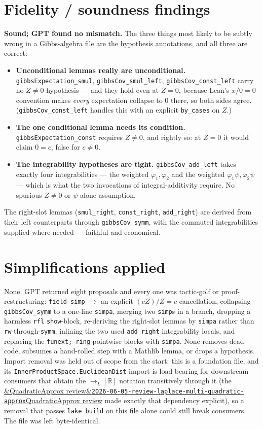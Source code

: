 \documentclass[11pt]{article}
\newcommand{\reviewref}[2][]{\href{https://therisensea.org/reviews/#2/}{\ifx&#1&\texttt{#2}\else#1\fi}}
\begin{document}
\section{Fidelity / soundness findings}
\textbf{Sound; GPT found no mismatch.} The three things most likely to be subtly wrong in a Gibbs-algebra file
are the hypothesis annotations, and all three are correct:
\begin{itemize}[noitemsep]
  \item \textbf{Unconditional lemmas really are unconditional.} \texttt{gibbsExpectation\_smul},
    \texttt{gibbsCov\_smul\_left}, \texttt{gibbsCov\_const\_left} carry no $Z\ne0$ hypothesis --- and they hold
    even at $Z=0$, because Lean's $x/0=0$ convention makes \emph{every} expectation collapse to $0$ there, so
    both sides agree. (\texttt{gibbsCov\_const\_left} handles this with an explicit \texttt{by\_cases} on $Z$.)
  \item \textbf{The one conditional lemma needs its condition.} \texttt{gibbsExpectation\_const} requires
    $Z\ne0$, and rightly so: at $Z=0$ it would claim $0=c$, false for $c\ne0$.
  \item \textbf{The integrability hypotheses are tight.} \texttt{gibbsCov\_add\_left} takes exactly four
    integrabilities --- the weighted $\varphi_1,\varphi_2$ and the weighted $\varphi_1\psi,\varphi_2\psi$ ---
    which is what the two invocations of integral-additivity require. No spurious $Z\ne0$ or $\psi$-alone
    assumption.
\end{itemize}
The right-slot lemmas (\texttt{smul\_right}, \texttt{const\_right}, \texttt{add\_right}) are derived from their
left counterparts through \texttt{gibbsCov\_symm}, with the commuted integrabilities supplied where needed ---
faithful and economical.

\section{Simplifications applied}
None. GPT returned eight proposals and every one was tactic-golf or proof-restructuring: \texttt{field\_simp}
$\to$ an explicit $(cZ)/Z=c$ cancellation, collapsing \texttt{gibbsCov\_symm} to a one-line \texttt{simpa},
merging two \texttt{simp}s in a branch, dropping a harmless \texttt{rfl} \texttt{show}-block, re-deriving the
right-slot lemmas by \texttt{simpa} rather than \texttt{rw}-through-\texttt{symm}, inlining the two used
\texttt{add\_right} integrability locals, and replacing the \texttt{funext; ring} pointwise blocks with
\texttt{simpa}. None removes dead code, subsumes a hand-rolled step with a Mathlib lemma, or drops a
hypothesis. Import removal was held out of scope from the start: this is a foundation file, and its
\texttt{InnerProductSpace.EuclideanDist} import is load-bearing for downstream consumers that obtain the
$\to_L[\mathbb R]$ notation transitively through it (the \reviewref[QuadraticApprox review]{2026-06-05-review-laplace-multi-quadratic-approx}
made exactly that dependency explicit), so a removal that passes \texttt{lake build} on this file alone could
still break consumers. The file was left byte-identical.
\end{document}
